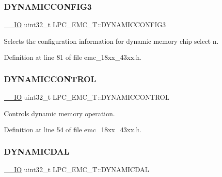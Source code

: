 \subsubsection{\texorpdfstring{D\+Y\+N\+A\+M\+I\+C\+C\+O\+N\+F\+I\+G3}{DYNAMICCONFIG3}}
{\footnotesize\ttfamily \hyperlink{core__sc300_8h_aec43007d9998a0a0e01faede4133d6be}{\+\_\+\+\_\+\+IO} uint32\+\_\+t L\+P\+C\+\_\+\+E\+M\+C\+\_\+\+T\+::\+D\+Y\+N\+A\+M\+I\+C\+C\+O\+N\+F\+I\+G3}

Selects the configuration information for dynamic memory chip select n. 

Definition at line 81 of file emc\+\_\+18xx\+\_\+43xx.\+h.

\mbox{\label{struct_l_p_c___e_m_c___t_a610b3aaf7c8309d997eb255bb0d19802}} 
\subsubsection{\texorpdfstring{D\+Y\+N\+A\+M\+I\+C\+C\+O\+N\+T\+R\+OL}{DYNAMICCONTROL}}
{\footnotesize\ttfamily \hyperlink{core__sc300_8h_aec43007d9998a0a0e01faede4133d6be}{\+\_\+\+\_\+\+IO} uint32\+\_\+t L\+P\+C\+\_\+\+E\+M\+C\+\_\+\+T\+::\+D\+Y\+N\+A\+M\+I\+C\+C\+O\+N\+T\+R\+OL}

Controls dynamic memory operation. 

Definition at line 54 of file emc\+\_\+18xx\+\_\+43xx.\+h.

\mbox{\label{struct_l_p_c___e_m_c___t_a581aab2ee249e0ccf05be6d59b4a0db7}} 
\subsubsection{\texorpdfstring{D\+Y\+N\+A\+M\+I\+C\+D\+AL}{DYNAMICDAL}}
{\footnotesize\ttfamily \hyperlink{core__sc300_8h_aec43007d9998a0a0e01faede4133d6be}{\+\_\+\+\_\+\+IO} uint32\+\_\+t L\+P\+C\+\_\+\+E\+M\+C\+\_\+\+T\+::\+D\+Y\+N\+A\+M\+I\+C\+D\+AL}

